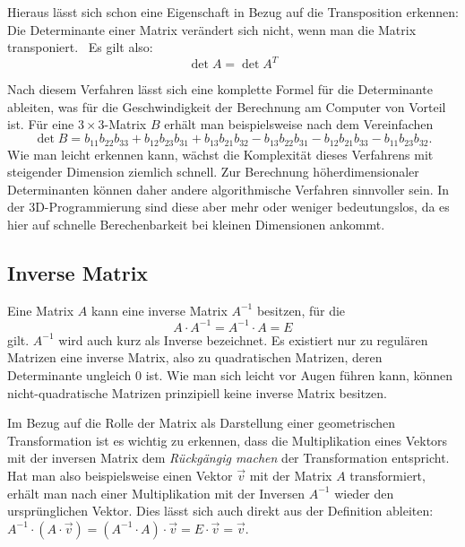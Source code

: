 Hieraus lässt sich schon eine Eigenschaft in Bezug auf die Transposition erkennen: Die Determinante einer Matrix verändert sich nicht, wenn man die Matrix transponiert. \ Es gilt also:
\begin{equation}
\label{transposeddeterminant}
 \det A = \det A^T
\end{equation}

Nach diesem Verfahren lässt sich eine komplette Formel für die Determinante ableiten, was für die Geschwindigkeit der Berechnung am Computer von Vorteil ist. Für eine $3 \times 3$-Matrix $B$ erhält man beispielsweise nach dem Vereinfachen
\begin{equation}
 \det B = b_{11} b_{22} b_{33} + b_{12} b_{23} b_{31} + b_{13} b_{21} b_{32} - b_{13} b_{22} b_{31} - b_{12} b_{21} b_{33} - b_{11} b_{23} b_{32}.
\end{equation}
Wie man leicht erkennen kann, wächst die Komplexität dieses Verfahrens mit steigender Dimension ziemlich schnell. Zur Berechnung höherdimensionaler Determinanten können daher andere algorithmische Verfahren sinnvoller sein. In der 3D-Programmierung sind diese aber mehr oder weniger bedeutungslos, da es hier auf schnelle Berechenbarkeit bei kleinen Dimensionen ankommt.

\subsection{Inverse Matrix}
\label{inversion}
Eine Matrix $A$ kann eine inverse Matrix $A^{-1}$ besitzen, für die
\begin{equation}
 A \cdot A^{-1} = A^{-1} \cdot A = E
\end{equation}
gilt. $A^{-1}$ wird auch kurz als Inverse bezeichnet. Es existiert nur zu regulären Matrizen eine inverse Matrix, also zu quadratischen Matrizen, deren Determinante ungleich $0$ ist. Wie man sich leicht vor Augen führen kann, können nicht-quadratische Matrizen prinzipiell keine inverse Matrix besitzen. 

Im Bezug auf die Rolle der Matrix als Darstellung einer geometrischen Transformation ist es wichtig zu erkennen, dass die Multiplikation eines Vektors mit der inversen Matrix dem \emph{Rückgängig machen} der Transformation entspricht. Hat man also beispielsweise einen Vektor $\vec v$ mit der Matrix $A$ transformiert, erhält man nach einer Multiplikation mit der Inversen $A^{-1}$ wieder den ursprünglichen Vektor. Dies lässt sich auch direkt aus der Definition ableiten: $A^{-1} \cdot ( A \cdot \vec v ) = (A^{-1} \cdot A) \cdot \vec v = E \cdot \vec v = \vec v$.

